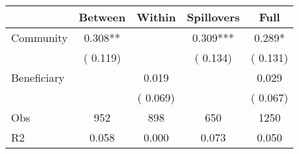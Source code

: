 
\begin{tabular}{l*{4}{c}}\hline&\multicolumn{1}{c}{Between}&\multicolumn{1}{c}{Within}&\multicolumn{1}{c}{Spillovers}&\multicolumn{1}{c}{Full}\\ \hline
 Community             &              0.308**      &                                               &        0.309*** &         0.289*                            \\ 
                               &        (       0.119)           &                                       &       (       0.134)     &      (       0.131)                                           \\ 
 Beneficiary   &                                               &        0.019    &                                &             0.029                            \\ 
                               &                                               & (       0.069)                  &                                        &      (       0.067)                                           \\ 
\hline                                                                                                                                                                                                                                            
 Obs                   &               952               &       898                       &       650                &              1250                                               \\ 
 R2                    &                      0.058              &              0.000                      &              0.073               &                     0.050                                              \\ 
\hline \end{tabular}                                                                                                                                                                                                              